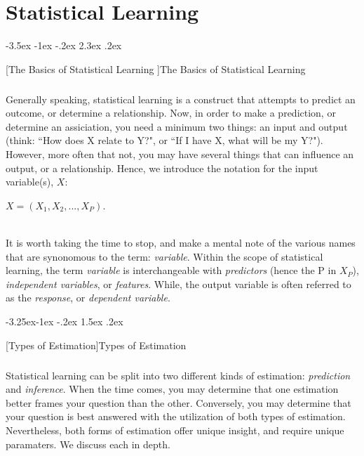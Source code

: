 \documentclass[titlepage, 12pt, twoside]{book}
\makeatletter
\renewcommand\section{\@startsection {section}{1}{\z@}%
	{-3.5ex \@plus -1ex \@minus -.2ex}%
	{2.3ex \@plus.2ex}%
	{\normalfont\Large\bfseries\raggedright}}
\renewcommand\subsection{\@startsection{subsection}{2}{\z@}%
	{-3.25ex\@plus -1ex \@minus -.2ex}%
	{1.5ex \@plus .2ex}%
	{\normalfont\large\bfseries\raggedright}}
\makeatother
\begin{document}
	\color{astral}\chapter{Statistical Learning}

	 \section[The Basics of Statistical Learning ]{The Basics of Statistical Learning} %

	
\color{black} 	\paragraph{} Generally speaking, statistical learning is a construct that attempts to predict an outcome, or determine a relationship. Now, in order to make a prediction, or determine an assiciation, you need a minimum two things: an input and output (think: ``How does X relate to Y?", or ``If I have X, what will be my Y?"). However, more often that not, you may have several  things that can influence an output, or a relationship. Hence, we introduce the notation for the input variable(s), $X$: 

\vspace{1mm}
\begin{center}	
	$X = (X_1, X_2, ... , X_P).  $  \\\
 \end{center}
\vspace{-5mm}

It is worth taking the time to stop, and make a mental note of the various names that are synonomous to the term: \textit{variable}. Within the scope of statistical learning, the term \textit{variable} is interchangeable with \textit{predictors} (hence the P in $X_P$), \textit{independent variables}, or \textit{features}. While, the output variable is often referred to as the \textit{response}, or \textit{dependent variable}. 

\color{astral}\subsection[Types of Estimation]{Types of Estimation}
		
\color{black} \paragraph{} Statistical learning can be split into two different kinds of estimation: \textit{prediction} and \textit{inference}. When the time comes, you may determine that one estimation better frames your question than the other. Conversely, you may determine that your question is best answered with the utilization of both types of estimation. Nevertheless, both forms of estimation offer unique insight, and require unique paramaters. We discuss each in depth. 
\end{document}
